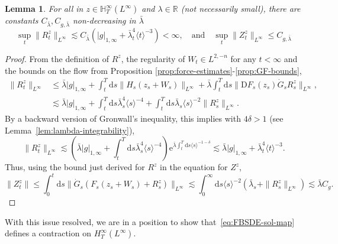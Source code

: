 \documentclass[11pt, a4paper]{scrartcl}
\numberwithin{equation}{section}
\theoremstyle{plain}
\newtheorem{lemma}[foo]{Lemma}
\theoremstyle{remark}
\newcommand{\mathD}{\mathrm{D}}
\newcommand{\mathd}{\mathrm{d}}
\newcommand{\mathe}{\mathrm{e}}
\begin{document}
\begin{lemma}
	\label{lem:B-to-B}For all in $z \in \mathbb{H}^{\infty}_T (L^{\infty})$ and
	$\lambda \in \mathbb{R}$ (not necessarily small), there are constants \(C_{\bar{\lambda}}, C_{g, \bar{\lambda}}\) non-decreasing in \(\bar{\lambda}\)  
	\[ \sup_t \| R^z_t \|_{L^{\infty}} \lesssim C_{\bar{\lambda}}( | g |_{1, \infty} +
		\bar{\lambda}_t^4 \langle t \rangle^{- 3} )< \infty, \quad \text{and} \quad
		\sup_t  \| Z^z_t \|_{L^{\infty}} \leqslant C_{g, \bar{\lambda}} \]
\end{lemma}

\begin{proof}
	From the definition of $R^z$, the regularity of $W_t \in L^{2, - n}$ for any
	$t < \infty$ and the bounds on the flow from Proposition
	\ref{prop:force-estimates}-\ref{prop:GF-bounds},
	\[ \begin{aligned}
			\| R_t^z \|_{L^{\infty}} & \leqslant  \bar{\lambda} | g |_{1, \infty} +
			\int_t^T \mathd s \| H_s (z_s + W_s) \|_{L^{\infty}} + \bar{\lambda} \int_t^T
			\mathd s \| \mathD F_s (z_s)  \dot{G}_s R^z_s \|_{L^{\infty}},                                             \\
			                         & \lesssim  \bar{\lambda} | g |_{1, \infty} + \int_t^T \mathd s \bar{\lambda}_s^4
			\langle s \rangle^{- 4} + \int_t^T \mathd s \bar{\lambda}_s \langle s
			\rangle^{- 2} \| R^z_s \|_{L^{\infty}} .
		\end{aligned} \]
	By a backward version of Gronwall's inequality, this implies with $4 \delta >
		1$ (see Lemma~\ref{lem:lambda-integrability}),
	\begin{equation}
		\| R_t^z \|_{L^{\infty}} \lesssim \left( \bar{\lambda} | g |_{1, \infty} +
		\int_t^T \mathd s \bar{\lambda}_s^4 \langle s \rangle^{- 4} \right)
		\mathe^{\bar{\lambda} \int_t^T \mathd s \langle s \rangle^{- 1 - \delta}}
		\lesssim \bar{\lambda} | g |_{1, \infty} + \bar{\lambda}_t^4 \langle t \rangle^{- 3} .
		\label{eq:exp-R}
	\end{equation}
	Thus, using the bound just derived for $R^z$ in the equation for $Z^z$,
	\[ \| Z^z_t \| \leqslant \int_0^t \mathd s \| \dot{G}_s (F_s (z_s + W_s) +
		R^z_s) \|_{L^{\infty}} \lesssim \int_0^{\infty} \mathd s \langle s
		\rangle^{- 2} (\bar{\lambda}_s + \| R_s^z \|_{L^{\infty}}) \lesssim \bar{\lambda} C_g
		. \]
\end{proof}

With this issue resolved, we are in a position to show
that~\eqref{eq:FBSDE-sol-map} defines a contraction on $H^{\infty}_T
	(L^{\infty})$.
\end{document}
